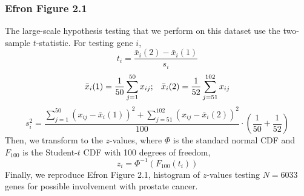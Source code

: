 \documentclass{article}
\begin{document}
\subsubsection*{Efron Figure 2.1}
\hspace{12 pt} The large-scale hypothesis testing that we perform on
this dataset use the two-sample $t$-statistic. \newline
For testing gene $i$,
\begin{displaymath}
t_i = \frac{\bar{x}_i(2) - \bar{x}_i(1)}{s_i}
\end{displaymath}
\begin{displaymath}
\bar{x}_i(1) = \frac{1}{50} \sum_{j=1}^{50} x_{ij} ; \hspace{8 pt}
\bar{x}_i(2) = \frac{1}{52} \sum_{j=51}^{102} x_{ij}
\end{displaymath}
\begin{displaymath}
s_i^2 = \frac{\sum_{j=1}^{50} (x_{ij} - \bar{x}_i(1))^2 +
  \sum_{j=51}^{102} (x_{ij} - \bar{x}_i(2))^2 }{100} \cdot (\frac{1}{50} + \frac{1}{52}) 
\end{displaymath}
Then, we transform to the $z$-values, 
where $\Phi$ is the standard normal CDF and $F_{100}$ is the Student-$t$ CDF
with 100 degrees of freedom,
\begin{displaymath}
z_i = \Phi^{-1}(F_{100}(t_i))
\end{displaymath}
Finally, we reproduce Efron
Figure 2.1, histogram of $z$-values testing $N=6033$ genes
for possible involvement with prostate cancer.

\end{document}
